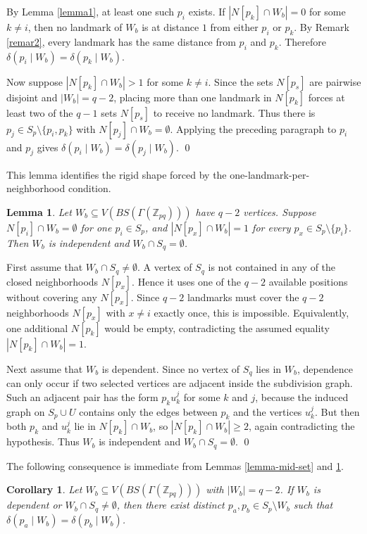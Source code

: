 \documentclass[12pt]{article}
\renewenvironment{proof}{{\bf \noindent Proof.}}{\qed}
\newtheorem{lemma}[theorem]{Lemma}
\newtheorem{corollary}[theorem]{Corollary}
\begin{document}
\begin{proof}
By Lemma \ref{lemma1}, at least one such $p_i$ exists. If $|N[p_k]\cap W_b|=0$ for some $k\neq i$, then no landmark of $W_b$ is at distance $1$ from either $p_i$ or $p_k$. By Remark \ref{remar2}, every landmark has the same distance from $p_i$ and $p_k$. Therefore $\delta(p_i\mid W_b)=\delta(p_k\mid W_b)$.

Now suppose $|N[p_k]\cap W_b|>1$ for some $k\neq i$. Since the sets $N[p_s]$ are pairwise disjoint and $|W_b|=q-2$, placing more than one landmark in $N[p_k]$ forces at least two of the $q-1$ sets $N[p_s]$ to receive no landmark. Thus there is $p_j\in S_p\setminus\{p_i,p_k\}$ with $N[p_j]\cap W_b=\emptyset$. Applying the preceding paragraph to $p_i$ and $p_j$ gives $\delta(p_i\mid W_b)=\delta(p_j\mid W_b)$.
\end{proof}

\medskip
\noindent This lemma identifies the rigid shape forced by the one-landmark-per-neighborhood condition.
\begin{lemma}\label{lemma-IND}
Let $W_b\subseteq V(BS(\Gamma(\mathbb Z_{pq})))$ have $q-2$ vertices. Suppose $N[p_i]\cap W_b=\emptyset$ for one $p_i\in S_p$, and $|N[p_x]\cap W_b|=1$ for every $p_x\in S_p\setminus\{p_i\}$. Then $W_b$ is independent and $W_b\cap S_q=\emptyset$.
\end{lemma}

\begin{proof}
First assume that $W_b\cap S_q\neq\emptyset$. A vertex of $S_q$ is not contained in any of the closed neighborhoods $N[p_x]$. Hence it uses one of the $q-2$ available positions without covering any $N[p_x]$. Since $q-2$ landmarks must cover the $q-2$ neighborhoods $N[p_x]$ with $x\neq i$ exactly once, this is impossible. Equivalently, one additional $N[p_k]$ would be empty, contradicting the assumed equality $|N[p_k]\cap W_b|=1$.

Next assume that $W_b$ is dependent. Since no vertex of $S_q$ lies in $W_b$, dependence can only occur if two selected vertices are adjacent inside the subdivision graph. Such an adjacent pair has the form $p_k u_k^j$ for some $k$ and $j$, because the induced graph on $S_p\cup U$ contains only the edges between $p_k$ and the vertices $u_k^j$. But then both $p_k$ and $u_k^j$ lie in $N[p_k]\cap W_b$, so $|N[p_k]\cap W_b|\geq 2$, again contradicting the hypothesis. Thus $W_b$ is independent and $W_b\cap S_q=\emptyset$.
\end{proof}

\medskip
\noindent The following consequence is immediate from Lemmas \ref{lemma-mid-set} and \ref{lemma-IND}.
\begin{corollary}\label{lemma-ind-and-K}
Let $W_b\subseteq V(BS(\Gamma(\mathbb Z_{pq})))$ with $|W_b|=q-2$. If $W_b$ is dependent or $W_b\cap S_q\neq\emptyset$, then there exist distinct $p_a,p_b\in S_p\setminus W_b$ such that $\delta(p_a\mid W_b)=\delta(p_b\mid W_b)$.
\end{corollary}
\end{document}
